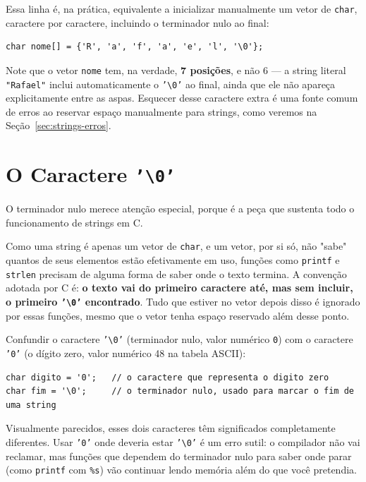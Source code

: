 Essa linha é, na prática, equivalente a inicializar manualmente um vetor de \texttt{char}, caractere por caractere, incluindo o terminador nulo ao final:

\begin{lstlisting}
char nome[] = {'R', 'a', 'f', 'a', 'e', 'l', '\0'};
\end{lstlisting}

Note que o vetor \texttt{nome} tem, na verdade, \textbf{7 posições}, e não 6 — a string literal \texttt{"Rafael"} inclui automaticamente o \texttt{'\textbackslash 0'} ao final, ainda que ele não apareça explicitamente entre as aspas. Esquecer desse caractere extra é uma fonte comum de erros ao reservar espaço manualmente para strings, como veremos na Seção~\ref{sec:strings-erros}.

\section{O Caractere \texttt{'\textbackslash 0'}}

O terminador nulo merece atenção especial, porque é a peça que sustenta todo o funcionamento de strings em C.

Como uma string é apenas um vetor de \texttt{char}, e um vetor, por si só, não "sabe" quantos de seus elementos estão efetivamente em uso, funções como \texttt{printf} e \texttt{strlen} precisam de alguma forma de saber onde o texto termina. A convenção adotada por C é: \textbf{o texto vai do primeiro caractere até, mas sem incluir, o primeiro \texttt{'\textbackslash 0'} encontrado}. Tudo que estiver no vetor depois disso é ignorado por essas funções, mesmo que o vetor tenha espaço reservado além desse ponto.

\begin{errocomum}
Confundir o caractere \texttt{'\textbackslash 0'} (terminador nulo, valor numérico \texttt{0}) com o caractere \texttt{'0'} (o dígito zero, valor numérico 48 na tabela ASCII):
\begin{lstlisting}
char digito = '0';   // o caractere que representa o digito zero
char fim = '\0';     // o terminador nulo, usado para marcar o fim de uma string
\end{lstlisting}
Visualmente parecidos, esses dois caracteres têm significados completamente diferentes. Usar \texttt{'0'} onde deveria estar \texttt{'\textbackslash 0'} é um erro sutil: o compilador não vai reclamar, mas funções que dependem do terminador nulo para saber onde parar (como \texttt{printf} com \texttt{\%s}) vão continuar lendo memória além do que você pretendia.
\end{errocomum}

